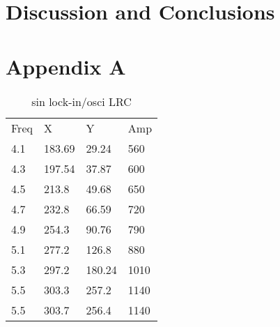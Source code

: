 \documentclass[12pt]{article}
\begin{document}
\section{Discussion and Conclusions}

% 
% 









\newpage
\section*{Appendix A}

\begin{table}[h]
\centering
    \begin{tabular}{llll}
    Freq & X      & Y      & Amp \\
    4.1  & 183.69 & 29.24  & 560 \\
    4.3  & 197.54 & 37.87  & 600 \\
    4.5  & 213.8  & 49.68  & 650 \\
    4.7  & 232.8  & 66.59  & 720 \\
    4.9  & 254.3  & 90.76  & 790 \\
    5.1  & 277.2  & 126.8  & 880 \\
    5.3  & 297.2  & 180.24 & 1010\\
    5.5  & 303.3  & 257.2  & 1140\\
    5.5  & 303.7  & 256.4  & 1140\\
    \end{tabular}
    \caption{sin lock-in/osci LRC}
    \label{tab:lock_in_LRC}
\end{table}
\end{document}
